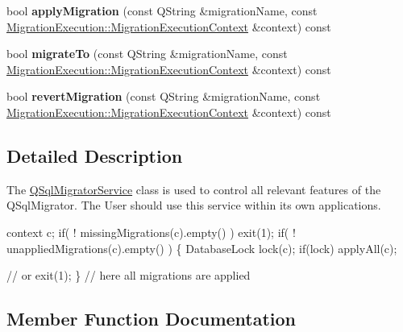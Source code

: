 \begin{DoxyCompactItemize}
bool {\bfseries apply\+Migration} (const Q\+String \&migration\+Name, const \hyperlink{class_q_sql_migrator_1_1_migration_execution_1_1_migration_execution_context}{Migration\+Execution\+::\+Migration\+Execution\+Context} \&context) const
\item 
\mbox{\label{class_q_sql_migrator_1_1_q_sql_migrator_service_ad0b7c6d1bf5af860fa626a9b49dbd8b2}} 
bool {\bfseries migrate\+To} (const Q\+String \&migration\+Name, const \hyperlink{class_q_sql_migrator_1_1_migration_execution_1_1_migration_execution_context}{Migration\+Execution\+::\+Migration\+Execution\+Context} \&context) const
\item 
\mbox{\label{class_q_sql_migrator_1_1_q_sql_migrator_service_a530fde5ddff2bd94fd6a4c6445af4efb}} 
bool {\bfseries revert\+Migration} (const Q\+String \&migration\+Name, const \hyperlink{class_q_sql_migrator_1_1_migration_execution_1_1_migration_execution_context}{Migration\+Execution\+::\+Migration\+Execution\+Context} \&context) const
\end{DoxyCompactItemize}


\subsection{Detailed Description}
The \hyperlink{class_q_sql_migrator_1_1_q_sql_migrator_service}{Q\+Sql\+Migrator\+Service} class is used to control all relevant features of the Q\+Sql\+Migrator. The User should use this service within it\textquotesingle{}s own applications. 

context c; if( ! missing\+Migrations(c).empty() ) exit(1); if( ! unapplied\+Migrations(c).empty() ) \{ Database\+Lock lock(c); if(lock) apply\+All(c);

// or exit(1); \} // here all migrations are applied 

\subsection{Member Function Documentation}
\mbox{\label{class_q_sql_migrator_1_1_q_sql_migrator_service_afb783f872cf79f4264031d202d262465}} 
